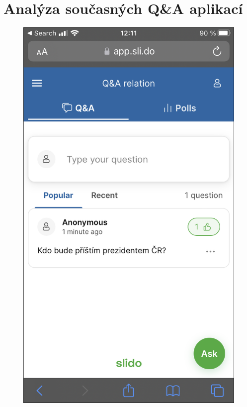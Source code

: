 \section{Analýza současných Q\&A aplikací}
\label{analyza}
\begin{figure}[h]
\centering
\begin{minipage}{.5\textwidth}
  \centering
  \includegraphics[width=.9\linewidth]{obrazky/slido_client.png}
  \label{fig:sub1}
\end{minipage}%
\begin{minipage}{.5\textwidth}
  \centering

\end{minipage}
\end{figure}

